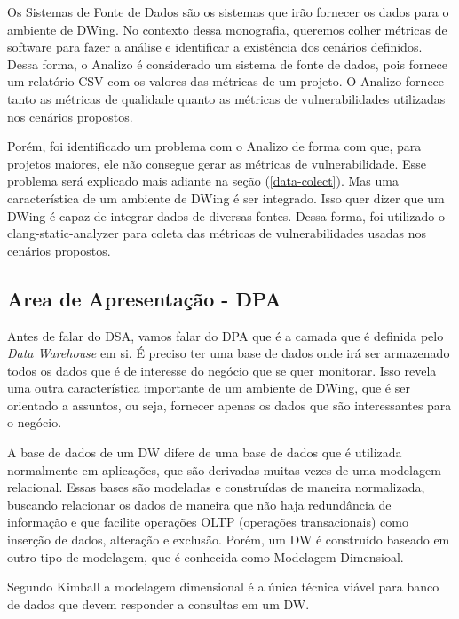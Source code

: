 Os Sistemas de Fonte de Dados são os sistemas que irão fornecer os dados para o ambiente de DWing. No contexto dessa monografia, queremos colher métricas de software para fazer a análise e identificar a existência dos cenários definidos. Dessa forma, o Analizo é considerado um sistema de fonte de dados, pois fornece um relatório CSV com os valores das métricas de um projeto. O Analizo fornece tanto as métricas de qualidade quanto as métricas de vulnerabilidades utilizadas nos cenários propostos. 

Porém, foi identificado um problema com o Analizo de forma com que, para projetos maiores, ele não consegue gerar as métricas de vulnerabilidade. Esse problema será explicado mais adiante na seção (\ref{data-colect}). Mas uma característica de um ambiente de DWing é ser integrado. Isso quer dizer que um DWing é capaz de integrar dados de diversas fontes. Dessa forma, foi utilizado o clang-static-analyzer para coleta das métricas de vulnerabilidades usadas nos cenários propostos.


\subsection{Area de Apresentação - DPA}

Antes de falar do DSA, vamos falar do DPA que é a camada que é definida pelo \emph{Data Warehouse} em si. É preciso ter uma base de dados onde irá ser armazenado todos os dados que é de interesse do negócio que se quer monitorar. Isso revela uma outra característica importante de um ambiente de DWing, que é ser orientado a assuntos, ou seja, fornecer apenas os dados que são interessantes para o negócio.

A base de dados de um DW difere de uma base de dados que é utilizada normalmente em aplicações, que são derivadas muitas vezes de uma modelagem relacional. Essas bases são modeladas e construídas de maneira normalizada, buscando relacionar os dados de maneira que não haja redundância de informação e que facilite operações OLTP (operações transacionais) como inserção de dados, alteração e exclusão. Porém, um DW é construído baseado em outro tipo de modelagem, que é conhecida como Modelagem Dimensioal.

Segundo Kimball \citeyear{kimball2002} a modelagem dimensional é a única técnica viável para banco de dados  que devem responder a consultas em um DW.


